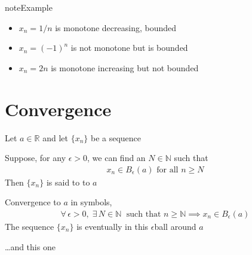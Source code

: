 \documentclass[letterpaper,10pt,english]{jupyterBook}
\begin{document}
\begin{sphinxadmonition}{note}{Example}
\begin{itemize}
\item {} 
\sphinxAtStartPar
\(x_n = 1/n\) is monotone decreasing, bounded

\item {} 
\sphinxAtStartPar
\(x_n = (-1)^n\) is not monotone but is bounded

\item {} 
\sphinxAtStartPar
\(x_n = 2n\) is monotone increasing but not bounded

\end{itemize}
\end{sphinxadmonition}


\section{Convergence}
\label{\detokenize{04.basic_analysis:convergence}}
\sphinxAtStartPar
Let \(a \in \mathbb{R}\) and let \(\{x_n\}\) be a sequence

\sphinxAtStartPar
Suppose, for any \(\epsilon > 0\), we can find an \(N \in \mathbb{N}\) such that
\begin{equation*}
\begin{split}
x_n \in B_\epsilon(a) \text{ for all } n \geq N
\end{split}
\end{equation*}
\sphinxAtStartPar
Then \(\{x_n\}\) is said to  to \(a\)

\sphinxAtStartPar
Convergence to \(a\) in symbols,
\begin{equation*}
\begin{split}
\forall \, \epsilon > 0, \;
\exists \, N \in \mathbb{N} \; 
\text{ such that } n \geq \mathbb{N} \implies x_n \in B_{\epsilon}(a)
\end{split}
\end{equation*}
\sphinxAtStartPar
The sequence \(\{x_n\}\) is eventually in this \(\epsilon\)\sphinxhyphen{}ball around \(a\)

\begin{figure}[htbp]
\centering

\noindent{}
\end{figure}

\sphinxAtStartPar
…and this one

\begin{figure}[htbp]
\centering

\noindent{}
\end{figure}
\end{document}
